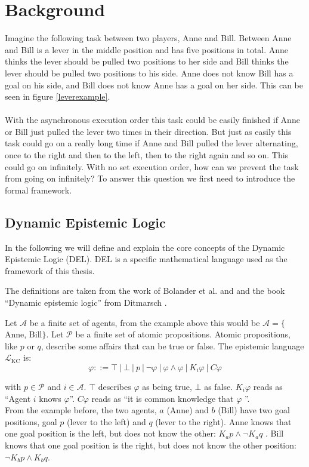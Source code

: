 \chapter{Background}\label{chap:background}

Imagine the following task between two players, Anne and Bill. Between Anne and Bill is a lever in the middle position and has five positions in total. Anne thinks the lever should be pulled two positions to her side and Bill thinks the lever should be pulled two positions to his side.
Anne does not know Bill has a goal on his side, and Bill does not know Anne has a goal on her side.
This can be seen in figure \ref{leverexample}.\\
 \\

With the asynchronous execution order this task could be easily finished if Anne or Bill just pulled the lever two times in their direction. But just as easily this task could go on a really long time if Anne and Bill pulled the lever alternating, once to the right and then to the left, then to the right again and so on. This could go on infinitely. With no set execution order, how can we prevent the task from going on infinitely? To answer this question we first need to introduce the formal framework.

\section{Dynamic Epistemic Logic}
In the following we will define and explain the core concepts of the Dynamic Epistemic Logic (DEL). DEL is a specific mathematical language used as the framework of this thesis.

The definitions are taken from the work of Bolander et al. \cite{bolander2018better} and \cite{bolander2017gentle} and the book ``Dynamic epistemic logic'' from Ditmarsch \cite{Ditmarsch2007}.

Let $\mathcal{A}$ be a finite set of agents, from the example above this would be $\mathcal{A} =\{$Anne, Bill$\}$. Let $\mathcal{P}$ be a finite set of atomic propositions. Atomic propositions, like $p$ or $q$, describe some affairs that can be true or false.
The epistemic language $\mathcal{L}_{\text{KC}}$ is: \\
$$
\varphi ::= \top \ | \ \bot \ | \ p \ | \ \neg \varphi \ | \ \varphi \wedge \varphi \ | \ K_i \varphi \ | \ C\varphi
$$

with $p \in \mathcal{P}$ and $i \in \mathcal{A}$.
$\top$ describes $\varphi$ as being true, $\bot$ as false.
$K_i \varphi$ reads as ``Agent $i$ knows $\varphi$''. $C \varphi$ reads as ``it is common knowledge that $\varphi$ ''.\\
From the example before, the two agents, $a$ (Anne) and $b$ (Bill) have two goal positions, goal $p$ (lever to the left) and $q$ (lever to the right). Anne knows that one goal position is the left, but does not know the other: $K_a p \wedge \neg K_a q$ . Bill knows that one goal position is the right, but does not know the other position: $\neg K_b  p \wedge K_b q$.


